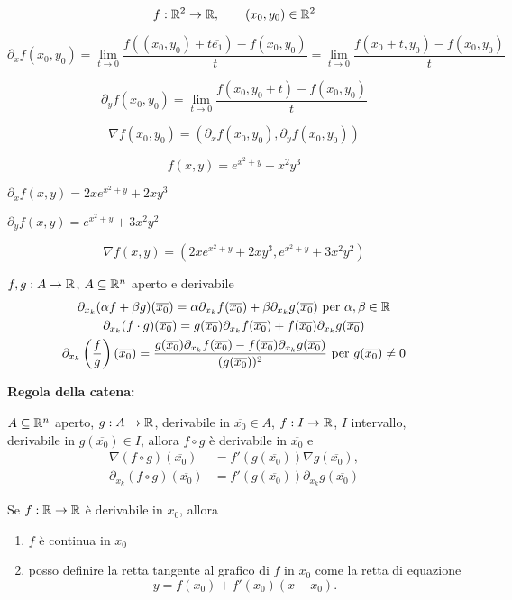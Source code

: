 \begin{exbar}
	$$f:\mathbb{R}^2\rightarrow\mathbb{R}, \qquad (x_0,y_0)\in\mathbb{R}^2$$
	
	{\color{blue}
		$$\partial_xf(x_0,y_0)=\lim_{t\rightarrow0}\frac{f((x_0,y_0)+t\overline{e_1})-f(x_0,y_0)}{t}=\lim_{t\rightarrow0}\frac{f(x_0+t,y_0)-f(x_0,y_0)}{t}$$
	}
	
	
	{\color{teal}
		$$\partial_y f(x_0,y_0)=\lim_{t \rightarrow 0}\frac{f(x_0,y_0+t)-f(x_0,y_0)}{t}$$
	}

	$$\nabla f(x_0,y_0)=(\partial_xf(x_0,y_0),\partial_yf(x_0,y_0))$$
	
	
	$$f(x,y)=e^{x^2+y}+x^2y^3$$
	
	$\partial_xf(x,y)=2xe^{x^2+y}+2xy^3$
	
	$\partial_yf(x,y)=e^{x^2+y}+3x^2y^2$
	
	$$\nabla f(x,y)=(2xe^{x^2+y}+2xy^3,e^{x^2+y}+3x^2y^2)$$
\end{exbar}


\begin{attbar}
	$f,g:A\rightarrow\mathbb{R}$, $A\subseteq\mathbb{R}^n$ aperto e derivabile
	\begin{gather*}
		\partial_{x_k}(\alpha f+\beta g)(\overline{x_0})=\alpha\partial_{x_k}f(\overline{x_0})+\beta\partial_{x_k}g(\overline{x_0}) \text{  per  }   \alpha,\beta\in\mathbb{R}
		\\
		\partial_{x_k}(f\cdot g)(\overline{x_0})=g(\overline{x_0})\partial_{x_k}f(\overline{x_0})+f(\overline{x_0})\partial_{x_k}g(\overline{x_0})
		\\
		\partial_{x_k}\left(\frac{f}{g}\right)(\overline{x_0})=\frac{g(\overline{x_0})\partial_{x_k}f(\overline{x_0})-f(\overline{x_0})\partial_{x_k}g(\overline{x_0})}{(g(\overline{x_0}))^2} \text{  per  } g(\overline{x_0})\neq 0
	\end{gather*}
\end{attbar}


\begin{attbar}
	\textbf{Regola della catena:}
	
	$A\subseteq \mathbb{R}^n$ aperto, $g:A\rightarrow \mathbb{R}$, derivabile in $\overline{x_0}\in A$, $f:I\rightarrow\mathbb{R}$, $I$ intervallo, derivabile in $g(\overline{x_0})\in I$, allora $f\circ g$ è derivabile in $\overline{x_0}$ e 
	\begin{align*}
		\nabla(f \circ g)(\overline{x_0})&=f'(g(\overline{x_0}))\nabla g(\overline{x_0}),\\
		\partial_{x_k}(f\circ g)(\overline{x_0})&=f'(g(\overline{x_0}))\partial_{x_k}g(\overline{x_0})
	\end{align*}
	
	Se $f:\mathbb{R}\rightarrow\mathbb{R}$ è derivabile in $x_0$, allora
	\begin{enumerate}
		\item $f$ è continua in $x_0$
		\item posso definire la retta tangente al grafico di $f$ in $x_0$ come la retta di equazione
		\begin{equation*}
			y=f(x_0)+f'(x_0)(x-x_0).
		\end{equation*}
	\end{enumerate}
\end{attbar}


